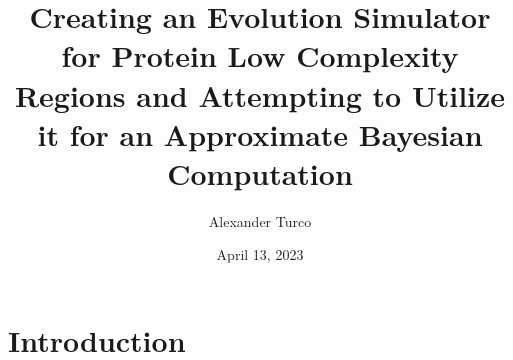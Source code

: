 \documentclass{beamer}
\title[BEAP Dec 2022]{Creating an Evolution Simulator for Protein Low Complexity Regions and Attempting to Utilize it for an Approximate Bayesian Computation}
\author{Alexander Turco}
\date{April 13, 2023}
\begin{document}
	
	\section{Introduction}
	\begin{frame}
		\titlepage 
	\end{frame}
	
	\logo{}
	

\end{document}
